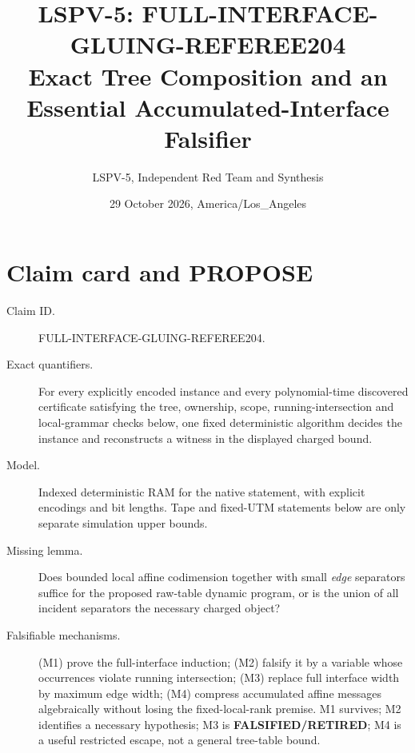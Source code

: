 \documentclass[11pt]{article}
\title{LSPV-5: FULL-INTERFACE-GLUING-REFEREE204\\[2pt]
\large Exact Tree Composition and an Essential Accumulated-Interface Falsifier}
\author{LSPV-5, Independent Red Team and Synthesis}
\date{29 October 2026, America/Los\_Angeles}
\begin{document}
\maketitle

\begin{center}
\end{center}

\section{Claim card and PROPOSE}
\begin{description}
\item[Claim ID.] FULL-INTERFACE-GLUING-REFEREE204.
\item[Exact quantifiers.] For every explicitly encoded instance and every
polynomial-time discovered certificate satisfying the tree, ownership,
scope, running-intersection and local-grammar checks below, one fixed
deterministic algorithm decides the instance and reconstructs a witness in
the displayed charged bound.
\item[Model.] Indexed deterministic RAM for the native statement, with
explicit encodings and bit lengths.  Tape and fixed-UTM statements below are
only separate simulation upper bounds.
\item[Missing lemma.] Does bounded local affine codimension together with
small \emph{edge} separators suffice for the proposed raw-table dynamic
program, or is the union of all incident separators the necessary charged
object?
\item[Falsifiable mechanisms.] (M1) prove the full-interface induction;
(M2) falsify it by a variable whose occurrences violate running intersection;
(M3) replace full interface width by maximum edge width; (M4) compress
accumulated affine messages algebraically without losing the fixed-local-rank
premise.  M1 survives; M2 identifies a necessary hypothesis; M3 is
\textbf{FALSIFIED/RETIRED}; M4 is a useful restricted escape, not a general
tree-table bound.
\end{description}
\end{document}
